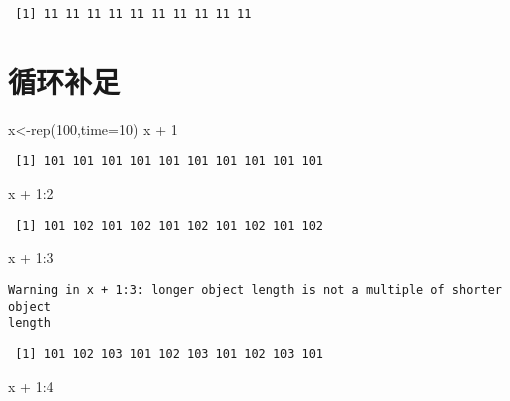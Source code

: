 \documentclass[
  letterpaper,
  DIV=11,
  numbers=noendperiod]{scrreprt}
\newenvironment{Shaded}{\begin{snugshade}}{\end{snugshade}}
\newcommand{\AttributeTok}[1]{\textcolor[rgb]{0.40,0.45,0.13}{#1}}
\newcommand{\DecValTok}[1]{\textcolor[rgb]{0.68,0.00,0.00}{#1}}
\newcommand{\FunctionTok}[1]{\textcolor[rgb]{0.28,0.35,0.67}{#1}}
\newcommand{\NormalTok}[1]{\textcolor[rgb]{0.00,0.23,0.31}{#1}}
\newcommand{\OtherTok}[1]{\textcolor[rgb]{0.00,0.23,0.31}{#1}}
\newcommand{\SpecialCharTok}[1]{\textcolor[rgb]{0.37,0.37,0.37}{#1}}
\begin{document}
\begin{verbatim}
 [1] 11 11 11 11 11 11 11 11 11 11
\end{verbatim}

\section{循环补足}\label{ux5faaux73afux8865ux8db3}

\begin{Shaded}
\begin{Highlighting}[]
\NormalTok{x}\OtherTok{\textless{}{-}}\FunctionTok{rep}\NormalTok{(}\DecValTok{100}\NormalTok{,}\AttributeTok{time=}\DecValTok{10}\NormalTok{)}
\NormalTok{x }\SpecialCharTok{+} \DecValTok{1}
\end{Highlighting}
\end{Shaded}

\begin{verbatim}
 [1] 101 101 101 101 101 101 101 101 101 101
\end{verbatim}

\begin{Shaded}
\begin{Highlighting}[]
\NormalTok{x }\SpecialCharTok{+} \DecValTok{1}\SpecialCharTok{:}\DecValTok{2}
\end{Highlighting}
\end{Shaded}

\begin{verbatim}
 [1] 101 102 101 102 101 102 101 102 101 102
\end{verbatim}

\begin{Shaded}
\begin{Highlighting}[]
\NormalTok{x }\SpecialCharTok{+} \DecValTok{1}\SpecialCharTok{:}\DecValTok{3}
\end{Highlighting}
\end{Shaded}

\begin{verbatim}
Warning in x + 1:3: longer object length is not a multiple of shorter object
length
\end{verbatim}

\begin{verbatim}
 [1] 101 102 103 101 102 103 101 102 103 101
\end{verbatim}

\begin{Shaded}
\begin{Highlighting}[]
\NormalTok{x }\SpecialCharTok{+} \DecValTok{1}\SpecialCharTok{:}\DecValTok{4}
\end{Highlighting}
\end{Shaded}
\end{document}
